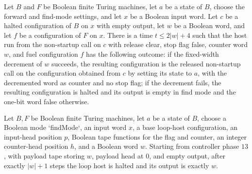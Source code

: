 \begin{lemma}
\label{Turing.FinTM.loopHost_reject}
\leanok
{}
Let $B$ and $F$ be Boolean finite Turing machines, let $a$ be a state of $B$, choose the
forward and find-mode settings, and let $x$ be a Boolean input word. Let $c$ be a halted
configuration of $B$ on $x$ with empty output, let $w$ be a Boolean word, and let $f$ be
a configuration of $F$ on $x$. There is a time $t\le 2|w|+4$ such that the host run from
the non-startup call on $c$ with release clear, stop flag false, counter word $w$, and
fuel configuration $f$ has the following outcome: if the fixed-width decrement of $w$
succeeds, the resulting configuration is the released non-startup call on the
configuration obtained from $c$ by setting its state to $a$, with the decremented word
as counter and no stop flag; if the decrement fails, the resulting configuration is
halted and its output is empty in find mode and the one-bit word false otherwise.
\end{lemma}

\begin{lemma}
\label{Turing.FinTM.loopHost_frame_replay}
\leanok
{}
Let $B,F$ be Boolean finite Turing machines, let $a$ be a state of $B$, choose a Boolean
mode `findMode`, an input word $x$, a base loop-host configuration, an input-head
position $p$, Boolean tape functions for the flag and counter, an integer counter-head
position $h$, and a Boolean word $w$. Starting from controller phase $13$, with payload
tape storing $w$, payload head at $0$, and empty output, after exactly $|w|+1$ steps the
loop host is halted and its output is exactly $w$.
\end{lemma}

